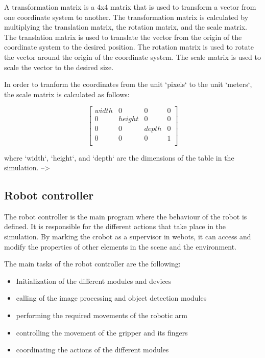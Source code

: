 A transformation matrix is a 4x4 matrix that is used to transform a vector from one coordinate system to another. The transformation matrix is calculated by multiplying the translation matrix, the rotation matrix, and the scale matrix. The translation matrix is used to translate the vector from the origin of the coordinate system to the desired position. The rotation matrix is used to rotate the vector around the origin of the coordinate system. The scale matrix is used to scale the vector to the desired size.



In order to tranform the coordinates from the unit `pixels` to the unit `meters`, the scale matrix is calculated as follows:

$$
\begin{bmatrix}
 width & 0 & 0 & 0 \\
 0 & height & 0 & 0 \\
 0 & 0 & depth & 0 \\
 0 & 0 & 0 & 1 \\
\end{bmatrix}
$$

where `width`, `height`, and `depth` are the dimensions of the table in the simulation. -->

\subsection{Robot controller}

The robot controller is the main program where the behaviour of the robot is defined. It is responsible for the different actions that take place in the simulation. By marking the crobot as a supervisor in webots, it can access and modify the properties of other elements in the scene and the environment. 

The main tasks of the robot controller are the following:

\begin{itemize}
    \item Initialization of the different modules and devices
    \item calling of the image processing and object detection modules
    \item performing the required movements of the robotic arm
    \item controlling the movement of the gripper and its fingers
    \item coordinating the actions of the different modules
\end{itemize}

